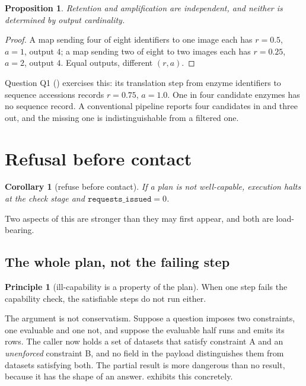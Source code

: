 \documentclass[11pt,a4paper]{article}
\theoremstyle{plain}
\newtheorem{proposition}[theorem]{Proposition}
\newtheorem{corollary}[theorem]{Corollary}
\theoremstyle{definition}
\newtheorem{principle}[theorem]{Principle}
\theoremstyle{remark}
\begin{document}
\begin{proposition}
Retention and amplification are independent, and neither is determined
by output cardinality.
\end{proposition}
\begin{proof}
A map sending four of eight identifiers to one image each has
$r = 0.5$, $a = 1$, output $4$; a map sending two of eight to two images
each has $r = 0.25$, $a = 2$, output $4$. Equal outputs, different
$(r,a)$.
\end{proof}

Question Q1 () exercises this: its translation step from
enzyme identifiers to sequence accessions records $r = 0.75$, $a = 1.0$.
One in four candidate enzymes has no sequence record. A conventional
pipeline reports four candidates in and three out, and the missing one
is indistinguishable from a filtered one.

\section{Refusal before contact}
\label{sec:refusal}

\begin{corollary}[refuse before contact]
\label{cor:refuse}
If a plan is not well-capable, execution halts at the check stage and
$\texttt{requests\_issued} = 0$.
\end{corollary}

Two aspects of this are stronger than they may first appear, and both
are load-bearing.

\subsection{The whole plan, not the failing step}

\begin{principle}[ill-capability is a property of the plan]
\label{prin:whole}
When one step fails the capability check, the satisfiable steps do not
run either.
\end{principle}

The argument is not conservatism. Suppose a question imposes two
constraints, one evaluable and one not, and suppose the evaluable half
runs and emits its rows. The caller now holds a set of datasets that
satisfy constraint A and an \emph{unenforced} constraint B, and no field
in the payload distinguishes them from datasets satisfying both. The
partial result is more dangerous than no result, because it has the
shape of an answer.  exhibits this concretely.
\end{document}
